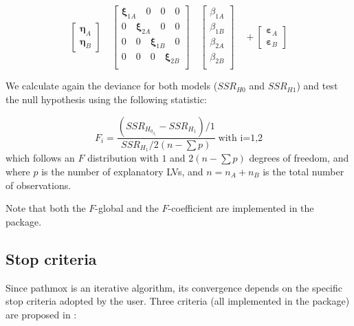 \begin{equation}
\label{al2}
\left[\begin{array}{l}
\boldsymbol{\eta}_A \\
\boldsymbol{\eta}_B 
\end{array}\right] \quad
\left[\begin{array}{ccc}
\boldsymbol{\xi}_{1A}\quad 0 \quad0 \quad0\\
0 \quad\boldsymbol{\xi}_{2A}\quad0 \quad0\\
0 \quad0 \quad\boldsymbol{\xi}_{1B} \quad0\\
0 \quad0 \quad0 \quad \boldsymbol{\xi}_{2B}\\
\end{array}\right] \quad
\left[\begin{array}{l}
\beta_{1A} \\
\beta_{1B} \\
\beta_{2A} \\
\beta_{2B} \\
\end{array}\right]  \quad +
\left[\begin{array}{l}
\boldsymbol{\varepsilon}_A \\
\boldsymbol{\varepsilon}_B 
\end{array}\right] 
\end{equation}

We calculate again the deviance for both models ($SSR_{H0}$ and $SSR_{H1}$) and test the null hypothesis using the following statistic: 

\begin{equation}
\label{F_coefl}
F_i  = \frac{\left(SSR_{H_{0_{\beta_i}}}-SSR_{H_1}\right) \Bigg/1}{SSR_{H_1}\Bigg/2\left(n-\sum p\right)}  \; \text{with i=1,2}
\end{equation}
which follows an $F$ distribution with $1$ and $2\left(n - \sum p\right)$ degrees of freedom, and where $p$ is the number of explanatory LVs, and  $n = n_A + n_B$ is the total number of observations.

Note that both the $F$-global and the $F$-coefficient are implemented in the  package.

\subsection{Stop criteria}

Since pathmox is an iterative algorithm, its convergence depends on the specific stop criteria adopted by the user.  Three criteria (all implemented in the  package) are proposed in \citet{Lamberti16}:

